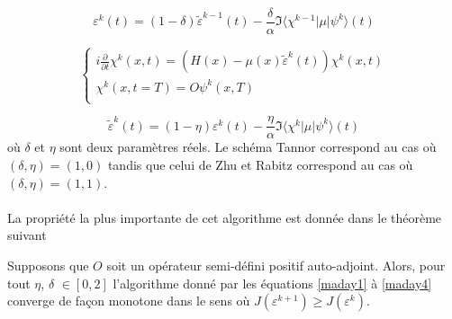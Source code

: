 \begin{equation} \label{maday2}
\varepsilon^k (t) = (1-\delta)\tilde{\varepsilon}^{k-1}(t)-\frac{\delta}{\alpha} \Im\langle\chi^{k-1}|\mu|\psi^{k}\rangle(t)
\end{equation}

\begin{equation} \label{maday3}
\begin{cases}
i \frac{\partial }{\partial t} \chi^k (x,t) = (H(x)-\mu(x)\tilde{\varepsilon}^k (t))\chi^k (x,t)\\
\chi^k (x,t=T) = O\psi^k(x,T)\\
\end{cases}
\end{equation}

\begin{equation} \label{maday4}
\tilde{\varepsilon}^k (t) = (1-\eta)\varepsilon^{k}(t)-\frac{\eta}{\alpha} \Im\langle\chi^{k}|\mu|\psi^{k}\rangle(t)
\end{equation}
où $\delta$ et $\eta$ sont deux paramètres réels. Le schéma Tannor \cite{Tannor} correspond au cas où $(\delta,\eta)= (1, 0)$ tandis que celui de Zhu et Rabitz \cite{Zhu} correspond au cas où $(\delta,\eta)= (1, 1)$.\\\\
La propriété la plus importante de cet algorithme est donnée dans le théorème suivant \cite{Maday}        
\begin{theorem}
Supposons que $O$ soit un opérateur semi-défini positif auto-adjoint. Alors, pour tout $\eta$, $\delta$ $\in [0,2]$ l'algorithme donné par les équations \eqref{maday1} à \eqref{maday4} converge de façon monotone dans le sens où $J(\varepsilon^{k+1}) \geq J(\varepsilon^{k})$.
\end{theorem}

